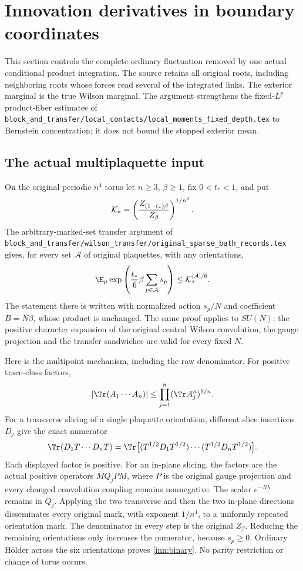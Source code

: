 \section{Innovation derivatives in boundary coordinates}
\label{sec:innovation}

This section controls the complete ordinary fluctuation removed by one actual conditional product integration. The source retains all original roots, including neighboring roots whose forces read several of the integrated links. The exterior marginal is the true Wilson marginal. The argument strengthens the fixed-$L^p$ product-fiber estimates of \texttt{block\_and\_transfer/local\_contacts/local\_moments\_fixed\_depth.tex} to Bernstein concentration; it does not bound the stopped exterior mean.

\subsection{The actual multiplaquette input}

On the original periodic $n^4$ torus let $n\ge3$, $\beta\ge1$, fix $0<t_*<1$, and put
\begin{equation}
 {\cal K}_*=\left(\frac{Z_{(1-t_*)\beta}}{Z_\beta}\right)^{1/n^4}.
 \label{inn:K}
\end{equation}
The arbitrary-marked-set transfer argument of \texttt{block\_and\_transfer/wilson\_transfer/original\_sparse\_bath\_records.tex} gives, for every set $\mathcal A$ of original plaquettes, with any orientations,
\begin{equation}
 \E_\mu\exp\left(\frac{t_*}{6}\beta\sum_{p\in{\cal A}}s_p\right)
 \le {\cal K}_*^{|{\cal A}|/6}.
 \label{inn:binary}
\end{equation}
The statement there is written with normalized action $s_p/N$ and coefficient $B=N\beta$, whose product is unchanged. The same proof applies to $SU(N)$: the positive character expansion of the original central Wilson convolution, the gauge projection and the transfer sandwiches are valid for every fixed $N$.

Here is the multipoint mechanism, including the raw denominator. For positive trace-class factors,
\[
 |\Tr(A_1\cdots A_n)|\le\prod_{j=1}^n(\Tr A_j^n)^{1/n}.
\]
For a transverse slicing of a single plaquette orientation, different slice insertions $D_j$ give the exact numerator
\[
 \Tr(D_1T\cdots D_nT)=
 \Tr\bigl[(T^{1/2}D_1T^{1/2})\cdots(T^{1/2}D_nT^{1/2})\bigr].
\]
Each displayed factor is positive. For an in-plane slicing, the factors are the actual positive operators $M Q_j P M$, where $P$ is the original gauge projection and every changed convolution coupling remains nonnegative. The scalar $e^{-N\lambda}$ remains in $Q_j$. Applying the two transverse and then the two in-plane directions disseminates every original mark, with exponent $1/n^4$, to a uniformly repeated orientation mark. The denominator in every step is the original $Z_\beta$. Reducing the remaining orientations only increases the numerator, because $s_p\ge0$. Ordinary H\"older across the six orientations proves \eqref{inn:binary}. No parity restriction or change of torus occurs.

